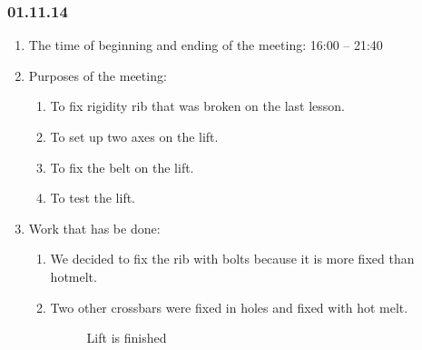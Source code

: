 
\subsubsection{01.11.14}

\begin{enumerate}
	\item The time of beginning and ending of the meeting:
	16:00 – 21:40
	\item Purposes of the meeting:
	\begin{enumerate}
	  \item To fix rigidity rib that was broken on the last lesson.
	  
	  \item To set up two axes on the lift.
	  
	  \item To	fix the belt on the lift.
	  
	  \item To	test the lift.
	  
    \end{enumerate}
    
	\item Work that has be done:
	\begin{enumerate}
	  \item	We decided to fix the rib with bolts because it is more fixed than hotmelt.
      
      \item Two other crossbars were fixed in holes and fixed with hot melt.
      
      \begin{figure}[H]
      	\begin{minipage}[h]{1\linewidth}
      		\caption{Lift is finished}
      	\end{minipage}
      \end{figure}
      

\end{enumerate}
\end{enumerate}
